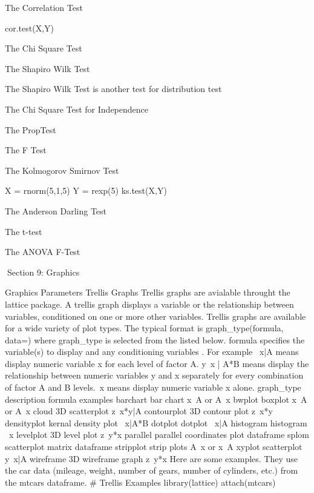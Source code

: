 The Correlation Test

cor.test(X,Y)


The Chi Square Test





The Shapiro Wilk Test

The Shapiro Wilk Test is another test for distribution test





The Chi Square Test for Independence





The PropTest





The F Test





The Kolmogorov Smirnov Test

X = rnorm(5,1,5)
Y = rexp(5)
ks.test(X,Y)


The Anderson Darling Test






The t-test







The ANOVA F-Test

 
Section 9: Graphics


Graphics Parameters
Trellis Graphs
Trellis graphs are avialable throught the lattice package. A trellis graph displays a variable or the relationship between variables, conditioned on one or more other variables. Trellis graphs are available for a wide variety of plot types.
The typical format is
graph_type(formula, data=)
where graph_type is selected from the listed below. formula specifies the variable(s) to display and any conditioning variables . For example ~x|A means display numeric variable x for each level of factor A. y~x | A*B means display the relationship between numeric variables y and x separately for every combination of factor A and B levels.~x means display numeric variable x alone.
graph_type
description
formula examples
barchart
bar chart
x~A or A~x
bwplot
boxplot
x~A or A~x
cloud
3D scatterplot
z~x*y|A
contourplot
3D contour plot
z~x*y
densityplot
kernal density plot
~x|A*B
dotplot
dotplot
~x|A
histogram
histogram
~x
levelplot
3D level plot
z~y*x
parallel
parallel coordinates plot
dataframe
splom
scatterplot matrix
dataframe
stripplot
strip plots
A~x or x~A
xyplot
scatterplot
y~x|A
wireframe
3D wireframe graph
z~y*x
Here are some examples. They use the car data (mileage, weight, number of gears, number of cylinders, etc.) from the mtcars dataframe.
# Trellis Examples 
library(lattice) 
attach(mtcars)

